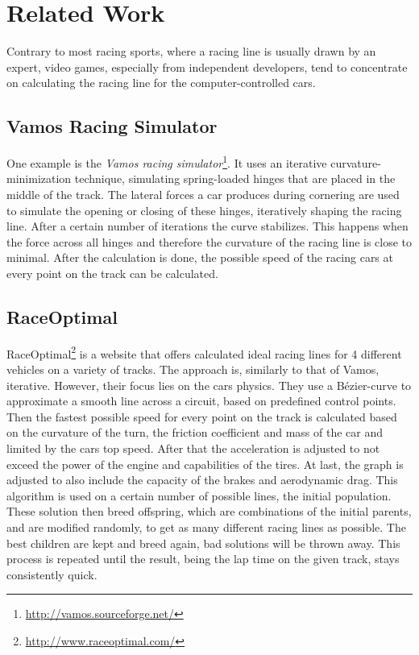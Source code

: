 \section{Related Work}
\label{sec:related_work}

Contrary to most racing sports, where a racing line is usually drawn by an expert, video games, especially from independent developers, tend to concentrate on calculating the racing line for the computer-controlled cars.

\subsection{Vamos Racing Simulator}
One example is the \textit{Vamos racing simulator}\footnote{\url{http://vamos.sourceforge.net/}}. It uses an iterative cur\-va\-ture-min\-i\-mi\-za\-tion technique, simulating spring-loaded hinges that are placed in the middle of the track. The lateral forces a car produces during cornering are used to simulate the opening or closing of these hinges, iteratively shaping the racing line. After a certain number of iterations the curve stabilizes. This happens when the force across all hinges and therefore the curvature of the racing line is close to minimal. After the calculation is done, the possible speed of the racing cars at every point on the track can be calculated. 

\subsection{RaceOptimal}
RaceOptimal\footnote{\url{http://www.raceoptimal.com/}} is a website that offers calculated ideal racing lines for 4 different vehicles on a variety of tracks. The approach is, similarly to that of Vamos, iterative. However, their focus lies on the cars physics. They use a Bézier-curve to approximate a smooth line across a circuit, based on predefined control points. Then the fastest possible speed for every point on the track is calculated based on the curvature of the turn, the friction coefficient and mass of the car and limited by the cars top speed. After that the acceleration is adjusted to not exceed the power of the engine and capabilities of the tires. At last, the graph is adjusted to also include the capacity of the brakes and aerodynamic drag. 
This algorithm is used on a certain number of possible lines, the initial population. These solution then breed offspring, which are combinations of the initial parents, and are modified randomly, to get as many different racing lines as possible.
The best children are kept and breed again, bad solutions will be thrown away. This process is repeated until the result, being the lap time on the given track, stays consistently quick.

